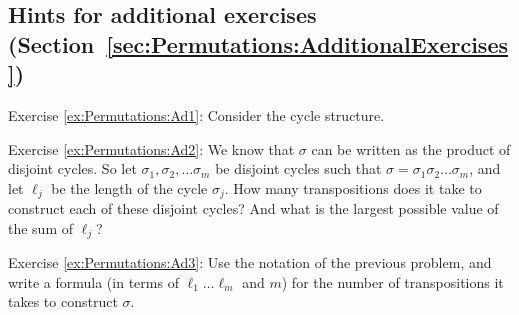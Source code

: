 \subsection{Hints for additional exercises (Section~\ref{sec:Permutations:AdditionalExercises})}

\noindent Exercise \ref{ex:Permutations:Ad1}: Consider the cycle structure.

\noindent Exercise \ref{ex:Permutations:Ad2}: We know that $\sigma$ can be written as the product of disjoint cycles. So let $\sigma_1, \sigma_2, \ldots \sigma_m$ be disjoint cycles such that  $\sigma = \sigma_1 \sigma_2 \ldots \sigma_m$, and let $\ell_j$ be the length of the cycle $\sigma_j$. How many transpositions does it take to construct each of these disjoint cycles? And what is the largest possible value of the sum of $\ell_j$?

\noindent Exercise \ref{ex:Permutations:Ad3}: Use the notation of the previous problem, and write a formula (in terms of $\ell_1 \ldots \ell_m$ and $m$) for the number of transpositions it takes to construct $\sigma$.
